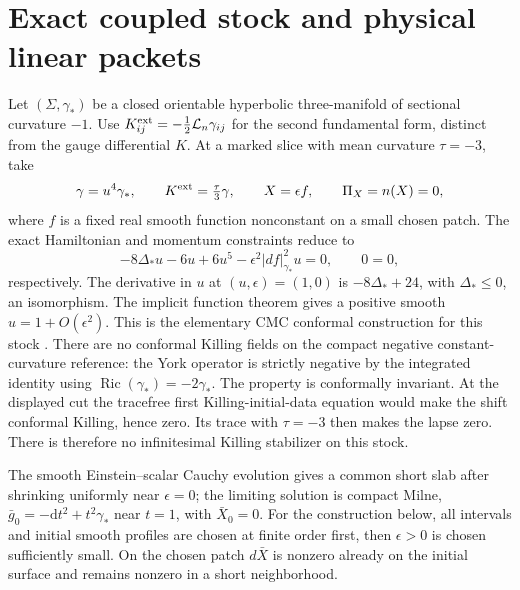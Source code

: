 \documentclass[11pt]{article}
\newcommand{\Lie}{\mathcal L}
\numberwithin{equation}{section}
\begin{document}
\section{Exact coupled stock and physical linear packets}

Let \((\Sigma,\gamma_*)\) be a closed orientable hyperbolic
three-manifold of sectional curvature \(-1\).
Use \(K_{ij}^{\rm ext}=-\tfrac12\Lie_n\gamma_{ij}\) for the
second fundamental form, distinct from the gauge differential
\(K\). At a marked slice with mean curvature \(\tau=-3\), take
\[
  \gamma=u^4\gamma_*,
  \qquad K^{\rm ext}=\tfrac{\tau}{3}\gamma,
  \qquad X=\epsilon f,\qquad \Pi_X=n(X)=0 ,
\]
where \(f\) is a fixed real smooth function nonconstant on a
small chosen patch. The exact Hamiltonian and momentum constraints
reduce to
\begin{equation}
 -8\Delta_*u-6u+6u^5-\epsilon^2|df|_{\gamma_*}^2u=0,
 \qquad 0=0 ,
 \label{eq:conformal}
\end{equation}
respectively. The derivative in \(u\) at \((u,\epsilon)=(1,0)\)
is \(-8\Delta_*+24\), with \(\Delta_*\le0\), an isomorphism.
The implicit function theorem gives a positive smooth
\(u=1+O(\epsilon^2)\). This is the elementary CMC conformal
construction for this stock \cite{cbip,icb}.
There are no conformal Killing fields on the compact negative
constant-curvature reference: the York operator is strictly
negative by the integrated identity using \(\operatorname{Ric}(\gamma_*)=-2\gamma_*\).
The property is conformally invariant. At the displayed cut the
tracefree first Killing-initial-data equation would make the
shift conformal Killing, hence zero. Its trace with \(\tau=-3\)
then makes the lapse zero. There is therefore no infinitesimal
Killing stabilizer on this stock.

The smooth Einstein--scalar Cauchy evolution gives a common
short slab after shrinking uniformly near \(\epsilon=0\);
the limiting solution is compact Milne,
\(\bar g_0=-\mathrm dt^2+t^2\gamma_*\) near \(t=1\), with
\(\bar X_0=0\). For the construction below, all intervals and
initial smooth profiles are chosen at finite order first, then
\(\epsilon>0\) is chosen sufficiently small. On the chosen
patch \(d\bar X\) is nonzero already on the initial surface
and remains nonzero in a short neighborhood.
\end{document}
